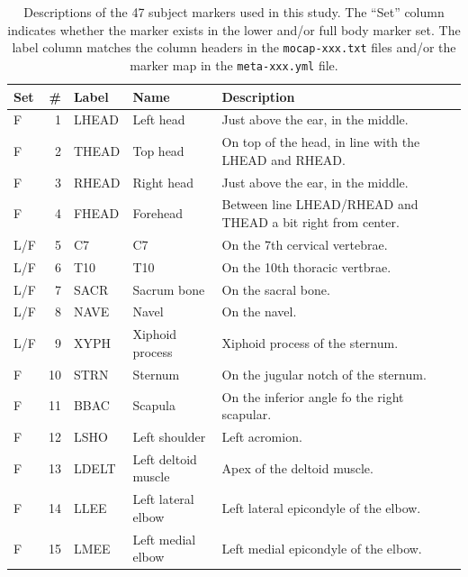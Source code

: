 \documentclass[fleqn,12pt]{wlpeerj}
\begin{document}
\begin{table}
  \cprotect\caption{Descriptions of the 47 subject markers used in this study.
    The ``Set'' column indicates whether the marker exists in the lower and/or
    full body marker set. The label column matches the column headers in the
    \verb|mocap-xxx.txt| files and/or the marker map in the \verb|meta-xxx.yml|
    file.}
  \centering
  \scriptsize
  \begin{tabular}{lrlll}
    \toprule
    Set & \# & Label & Name & Description \\
    \midrule
    F   & 1  & LHEAD & Left head                             & Just above the ear, in the middle. \\
    F   & 2  & THEAD & Top head                              & On top of the head, in line with the LHEAD and RHEAD. \\
    F   & 3  & RHEAD & Right head                            & Just above the ear, in the middle. \\
    F   & 4  & FHEAD & Forehead                              & Between line LHEAD/RHEAD and THEAD a bit right from center. \\
    L/F & 5  & C7    & C7                                    & On the 7th cervical vertebrae. \\
    L/F & 6  & T10   & T10                                   & On the 10th thoracic vertbrae. \\
    L/F & 7  & SACR  & Sacrum bone                           & On the sacral bone. \\
    L/F & 8  & NAVE  & Navel                                 & On the navel. \\
    L/F & 9  & XYPH  & Xiphoid process                       & Xiphoid process of the sternum. \\
    F   & 10 & STRN  & Sternum                               & On the jugular notch of the sternum. \\
    F   & 11 & BBAC  & Scapula                               & On the inferior angle fo the right scapular. \\
    F   & 12 & LSHO  & Left shoulder                         & Left acromion. \\
    F   & 13 & LDELT & Left deltoid muscle                   & Apex of the deltoid muscle. \\
    F   & 14 & LLEE  & Left lateral elbow                    & Left lateral epicondyle of the elbow. \\
    F   & 15 & LMEE  & Left medial elbow                     & Left medial epicondyle of the elbow. \\

\end{tabular}
\end{table}
\end{document}
